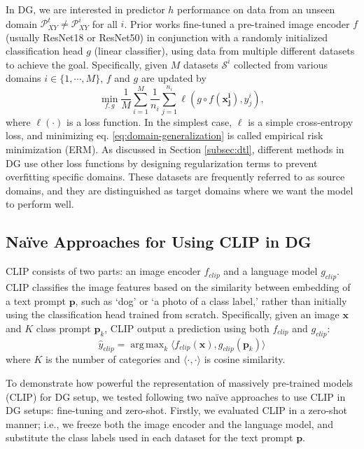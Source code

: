 \documentclass[letterpaper]{article} \usepackage[]{aaai23}
\DeclareMathOperator*{\argmax}{arg\,max}
\begin{document}
In DG, we are interested in predictor $h$ performance on data from an unseen domain $\mathcal{P}_{XY}^{t} \neq \mathcal{P}_{XY}^{i}$ for all $i$. 
Prior works fine-tuned a pre-trained image encoder $f$ (usually ResNet18 or ResNet50) in conjunction with a randomly initialized classification head $g$ (linear classifier), using data from multiple different datasets to achieve the goal. 
Specifically, given $M$ datasets $\mathcal{S}^{i}$ collected from various domains $i \in \{ 1, \cdots, M\}$,  $f$ and $g$ are updated by  
\begin{equation}
\label{eq:domain-generalization}
    \min_{f, g} \frac{1}{M}\sum_{i=1}^{M}\frac{1}{n_i}\sum_{j=1}^{n_i}\ell(g \circ f(\bm{x_j^i}), y_j^i),
\end{equation}
where $\ell(\cdot)$ is a loss function. 
In the simplest case, $\ell$ is a simple cross-entropy loss, and minimizing eq. \ref{eq:domain-generalization} is called empirical risk minimization (ERM).
As discussed in Section \autoref{subsec:dtl}, different methods in DG use other loss functions by designing regularization terms to prevent overfitting specific domains.
These datasets are frequently referred to as source domains, and they are distinguished as target domains where we want the model to perform well. 



\subsection{Na\"{i}ve Approaches for Using CLIP in DG}
CLIP consists of two parts: an image encoder $f_{clip}$ and a language model $g_{clip}$. 
CLIP classifies the image features based on the similarity between embedding of a text prompt $\bm{p}$, such as `dog' or `a photo of a {class label},' rather than initially using the classification head trained from scratch. 
Specifically, given an image $\bm{x}$ and $K$ class prompt $\bm{p}_k$, CLIP output a prediction using both $f_{clip}$ and $g_{clip}$:
\begin{equation}
\label{eq:domain-generalization}
    \hat{y}_{clip} = \argmax_{k}\langle f_{clip}(\bm{x}), g_{clip}(\bm{p}_k)\rangle
\end{equation}
where $K$ is the number of categories and $\langle \cdot,\cdot \rangle$ is cosine similarity.

To demonstrate how powerful the representation of massively pre-trained models (CLIP) for DG setup, we tested following two na\"{i}ve approaches to use CLIP in DG setups: fine-tuning and zero-shot.
Firstly, we evaluated CLIP in a zero-shot manner; i.e., we freeze both the image encoder and the language model, and substitute the class labels used in each dataset for the text prompt $\bm{p}$. 
\end{document}
